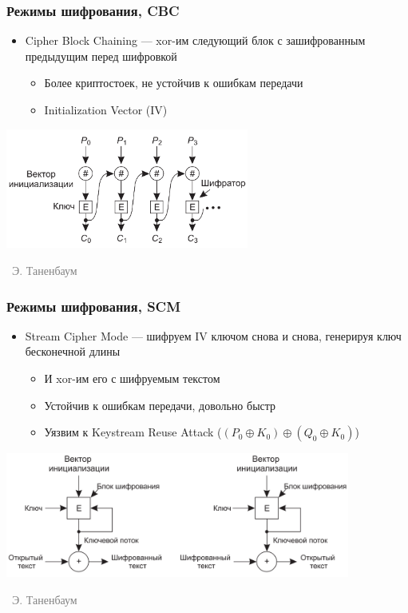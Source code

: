\documentclass[xetex,mathserif,serif]{beamer}
\newcommand{\attribution}[1] {
\vspace{-5mm}\begin{flushright}\begin{scriptsize}\textcolor{gray}{\textcopyright\, #1}\end{scriptsize}\end{flushright}
}
\begin{document}
    \begin{frame}
        \frametitle{Режимы шифрования, CBC}
        \begin{itemize}
            \item Cipher Block Chaining --- xor-им следующий блок с зашифрованным предыдущим перед шифровкой
            \begin{itemize}
                \item Более криптостоек, не устойчив к ошибкам передачи
                \item Initialization Vector (IV)
            \end{itemize}
        \end{itemize}
        \begin{center}
            \includegraphics[width=0.6\textwidth]{cbc.png}
            \attribution{Э. Таненбаум}
        \end{center}
    \end{frame}

    \begin{frame}
        \frametitle{Режимы шифрования, SCM}
        \begin{itemize}
            \item Stream Cipher Mode --- шифруем IV ключом снова и снова, генерируя ключ бесконечной длины
            \begin{itemize}
                \item И xor-им его с шифруемым текстом
                \item Устойчив к ошибкам передачи, довольно быстр
                \item Уязвим к Keystream Reuse Attack ($(P_0 \oplus K_0) \oplus (Q_0 \oplus K_0)$)
            \end{itemize}
        \end{itemize}
        \begin{center}
            \includegraphics[width=0.85\textwidth]{scm.png}
            \attribution{Э. Таненбаум}
        \end{center}
    \end{frame}
\end{document}
